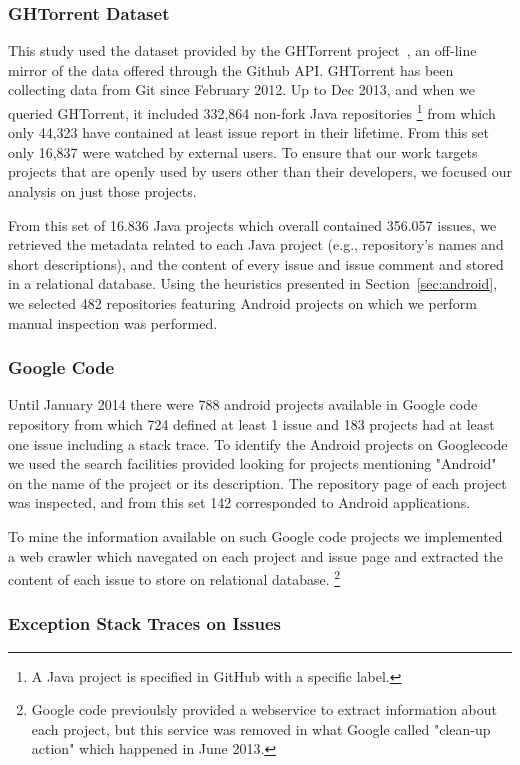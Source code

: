 \documentclass[conference]{IEEEtran}
\begin{document}
\subsubsection{GHTorrent Dataset} This study used the dataset provided by the GHTorrent project~\cite{Gousi13}, an off-line mirror of the data 
offered through the Github API.  GHTorrent has been collecting data from Git since 
February 2012. Up to Dec 2013, and when we queried GHTorrent, it included 332,864 non-fork Java
repositories \footnote {A Java project is specified in GitHub with a
specific label.}  from which only 44,323 have contained at least issue report in their lifetime. From this set only 16,837 were watched by external users. To ensure that our work targets projects that are openly used by
users other than their developers, we focused our analysis on just those projects. 

From this set of 16.836 Java projects which overall contained 356.057 issues, we retrieved the metadata related to each Java project (e.g., repository's names and short descriptions), and the content of every issue and issue comment and stored in a relational database. Using the heuristics presented in Section~\ref{sec:android}, we selected 482 repositories featuring Android projects on which we perform manual inspection was performed.


\subsubsection{Google Code}

Until January 2014 there were 788 android projects available in Google code repository from which 724 defined at least 1 issue and 183 projects 
had at least one issue including a stack trace. To identify the Android projects on Googlecode we used the search facilities provided looking for 
projects mentioning "Android" on the name of the project or its description. The repository page of each project was inspected, and from this set
142 corresponded to Android applications.

To mine the information available on such Google code projects we implemented a web crawler which navegated on each project and issue page
and extracted the content of each issue to store on relational database. \footnote{Google code previoulsly provided a webservice to extract information about each project, but this service was removed in what Google called "clean-up action" which happened in June 2013.}

\subsubsection{Exception Stack Traces on Issues}
\end{document}
